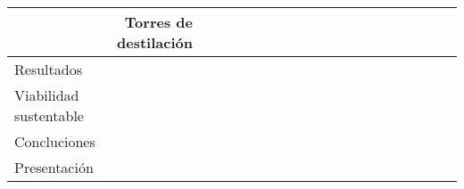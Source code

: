 \begin{table}[htbp]
\begin{turn}{90}
\begin{tabular}{lr|rrrrrrrrrrrrrrrrrr}
  \cmidrule{2-20}          & \multicolumn{1}{p{6.11em}|}{Torres de destilación} &       &       &       &       &       &       &       &       &       &       &       &       & \cellcolor[rgb]{ .776,  .937,  .808}\textcolor[rgb]{ 0,  .38,  0}{} &       &       &       &       &  \\
      \midrule
      Resultados &       &       &       &       &       &       &       &       &       &       &       &       &       & \cellcolor[rgb]{ .776,  .937,  .808}\textcolor[rgb]{ 0,  .38,  0}{} &       &       &       &       &  \\
      \midrule
      \multicolumn{1}{p{5.39em}}{Viabilidad sustentable} &       &       &       &       &       &       &       &       &       &       &       &       &       &       & \cellcolor[rgb]{ .776,  .937,  .808}\textcolor[rgb]{ 0,  .38,  0}{} &       &       &       &  \\
      \midrule
      Concluciones &       &       &       &       &       &       &       &       &       &       &       &       &       &       &       & \cellcolor[rgb]{ .776,  .937,  .808}\textcolor[rgb]{ 0,  .38,  0}{} & \cellcolor[rgb]{ .776,  .937,  .808}\textcolor[rgb]{ 0,  .38,  0}{} & \cellcolor[rgb]{ .776,  .937,  .808}\textcolor[rgb]{ 0,  .38,  0}{} &  \\
      \midrule
      Presentación &       &       &       &       &       &       &       &       &       &       &       &       &       &       &       &       &       &       & \cellcolor[rgb]{ .776,  .937,  .808}\textcolor[rgb]{ 0,  .38,  0}{} \\
      \bottomrule
      \end{tabular}%
    \end{turn}
    \label{tab:addlabel}%
  \end{table}%
  